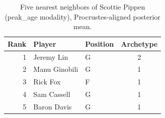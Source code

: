 \begin{table}[htbp]
  \centering\small
  \begin{tabular}{rllc}
    \toprule
    Rank & Player & Position & Archetype \\
    \midrule
    1 & Jeremy Lin & G & 2 \\
    2 & Manu Ginobili & G & 1 \\
    3 & Rick Fox & F & 1 \\
    4 & Sam Cassell & G & 1 \\
    5 & Baron Davis & G & 1 \\
    \bottomrule
  \end{tabular}
  \caption{Five nearest neighbors of Scottie Pippen (peak_age modality), Procrustes-aligned posterior mean.}
  \label{tab:Scottie_Pippen_neighbors_peak_age}
\end{table}

